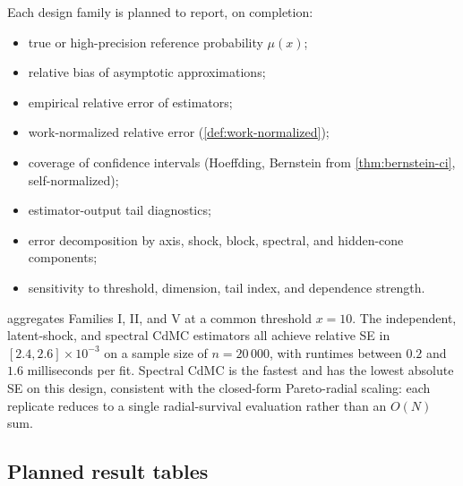 Each design family is planned to report, on completion:
\begin{itemize}
\item true or high-precision reference probability \(\mu(x)\);
\item relative bias of asymptotic approximations;
\item empirical relative error of estimators;
\item work-normalized relative error (\cref{def:work-normalized});
\item coverage of confidence intervals (Hoeffding, Bernstein from
\cref{thm:bernstein-ci}, self-normalized);
\item estimator-output tail diagnostics;
\item error decomposition by axis, shock, block, spectral, and hidden-cone
components;
\item sensitivity to threshold, dimension, tail index, and dependence strength.
\end{itemize}



 aggregates Families I, II,
and V at a common threshold $x = 10$. The independent, latent-shock,
and spectral CdMC estimators all achieve relative SE in
$[2.4, 2.6] \times 10^{-3}$ on a sample size of $n = 20\,000$, with
runtimes between $0.2$ and $1.6$ milliseconds per fit. Spectral CdMC is
the fastest and has the lowest absolute SE on this design, consistent
with the closed-form Pareto-radial scaling: each replicate reduces to a
single radial-survival evaluation rather than an $O(N)$ sum.

\subsection{Planned result tables}

\begin{table}[p]
\centering

\caption[Independent simulation results]{Independent simulation results. Values remain \xx{} until generated. The table
will report first-order and second-order accuracy, relative error, and runtime
for the independent baseline.}
\label{tab:sim-results-independent}
\end{table}

\begin{table}[p]
\centering

\caption[Dependent simulation results]{Dependent simulation results. Values remain \xx{} until generated. The table
will compare independent, copula-kernel, latent-shock, block, spectral, and
hidden-cone estimators under known dependence.}
\label{tab:sim-results-dependent}
\end{table}

